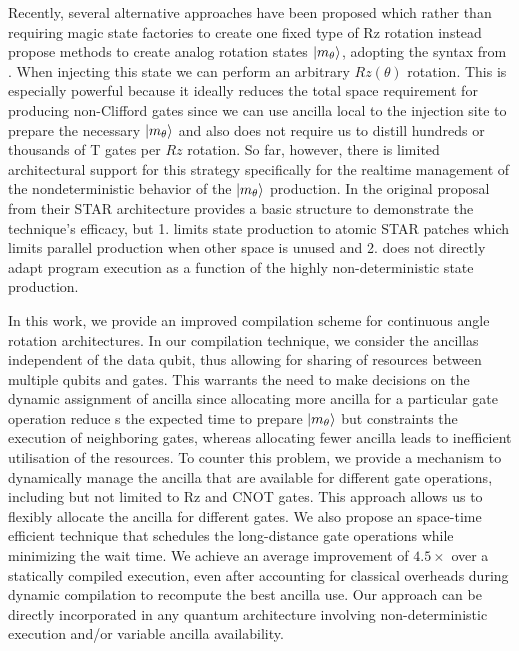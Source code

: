 Recently, several alternative approaches have been proposed \cite{akahoshi2023partially, choi2023fault} which rather than requiring magic state factories to create one fixed type of Rz rotation instead propose methods to create analog rotation states $\ket{m_\theta}$, adopting the syntax from \cite{akahoshi2023partially}. When injecting this state we can perform an arbitrary $Rz(\theta)$ rotation. This is especially powerful because it ideally reduces the total space requirement for producing non-Clifford gates since we can use ancilla local to the injection site to prepare the necessary $\ket{m_\theta}$ and also does not require us to distill hundreds or thousands of T gates per $Rz$ rotation. So far, however, there is limited architectural support for this strategy specifically for the realtime management of the nondeterministic behavior of the $\ket{m_\theta}$ production. In the original proposal from \cite{akahoshi2023partially} their STAR architecture provides a basic structure to demonstrate the technique's efficacy, but 1. limits state production to atomic STAR patches which limits parallel production when other space is unused and 2. does not directly adapt program execution as a function of the highly non-deterministic state production. 

In this work, we provide an improved compilation scheme for continuous angle rotation architectures. In our compilation technique, we consider the ancillas independent of the data qubit, thus allowing for sharing of resources between multiple qubits and gates. This warrants the need to make decisions on the dynamic assignment of ancilla since allocating more ancilla for a particular gate operation reduce s the expected time to prepare $\ket{m_\theta}$ but constraints the execution of neighboring gates, whereas allocating fewer ancilla leads to inefficient utilisation of the resources. To counter this problem, we provide a mechanism to dynamically manage the ancilla that are available for different gate operations, including but not limited to Rz and CNOT gates. This approach allows us to flexibly allocate the ancilla for different gates. We also propose an space-time efficient technique that schedules the long-distance gate operations while minimizing the wait time. We achieve an average improvement of $4.5\times$ over a statically compiled execution, even after accounting for classical overheads during dynamic compilation to recompute the best ancilla use. Our approach can be directly incorporated in any quantum architecture involving non-deterministic execution and/or variable ancilla availability.

